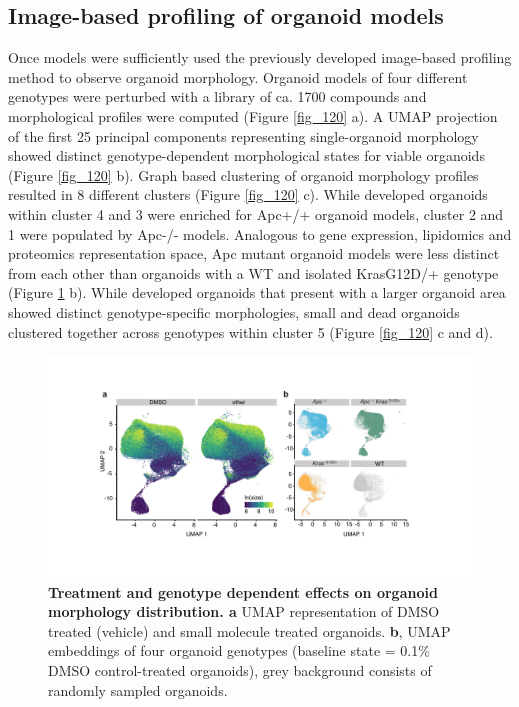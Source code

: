 \begin{flushleft}
\newpage
\section{Image-based profiling of organoid models}

Once models were sufficiently  used the previously developed image-based profiling method to observe organoid morphology. Organoid models of four different genotypes were perturbed with a library of ca. 1700 compounds and morphological profiles were computed (Figure \ref{fig_120} a). A UMAP projection of the first 25 principal components representing single-organoid morphology showed distinct genotype-dependent morphological states for viable organoids (Figure \ref{fig_120} b). Graph based clustering of organoid morphology profiles resulted in 8 different clusters (Figure \ref{fig_120} c). While developed organoids within cluster 4 and 3 were enriched for Apc+/+ organoid models, cluster 2 and 1 were populated by Apc-/- models. Analogous to gene expression, lipidomics and proteomics representation space, Apc mutant organoid models were less distinct from each other than organoids with a WT and isolated KrasG12D/+ genotype (Figure \ref{fig_140} b). While developed organoids that present with a larger organoid area showed distinct genotype-specific morphologies, small and dead organoids clustered together across genotypes within cluster 5 (Figure \ref{fig_120} c and d). 

\bigbreak
\begin{figure}[h!]
\centering
\includegraphics[width=\textwidth,
                height=\textheight,
                keepaspectratio]{figures/adenomaprofiling/pdf/fig_1_4.pdf}
\caption{\textbf{Treatment and genotype dependent effects on organoid morphology distribution. a} UMAP representation of DMSO treated (vehicle) and small molecule treated organoids. \textbf{b}, UMAP embeddings of four organoid genotypes (baseline state = 0.1\% DMSO control-treated organoids), grey background consists of randomly sampled organoids.}
\label{fig_140}
\end{figure}


\end{flushleft}
